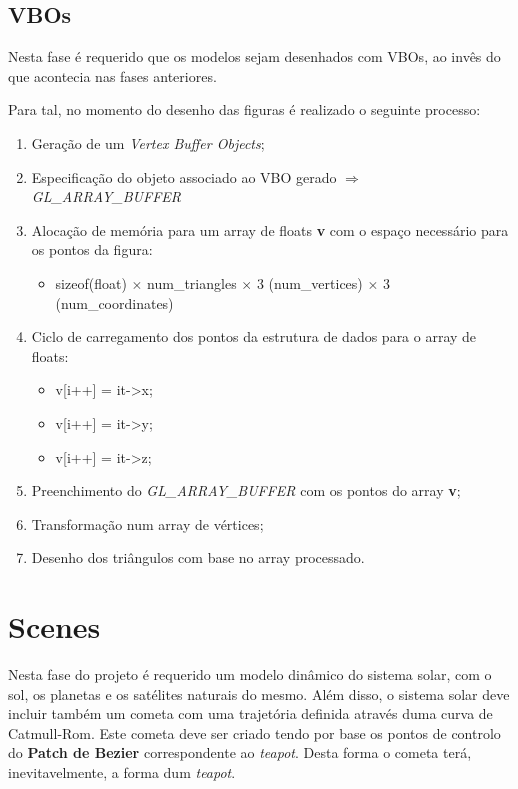 \documentclass[a4paper]{article}
\begin{document}
\subsection{VBOs}
\label{sec:vbos}

Nesta fase é requerido que os modelos sejam desenhados com VBOs, ao invês do que acontecia nas fases anteriores.

Para tal, no momento do desenho das figuras é realizado o seguinte processo:

\ttfamily
\begin{enumerate}
  \item Geração de um \textit{Vertex Buffer Objects};
  \item Especificação do objeto associado ao VBO gerado $\Rightarrow$ \textit{GL\_ARRAY\_BUFFER}
  \item Alocação de memória para um array de floats \textbf{v} com o espaço necessário para os pontos da figura:
    \begin{itemize}
      \item sizeof(float) $\times$ num\_triangles $\times$ 3 (num\_vertices) $\times$ 3 (num\_coordinates)
    \end{itemize}
  \item Ciclo de carregamento dos pontos da estrutura de dados para o array de floats:
    \begin{itemize}
      \item v[i++] = it->x;
      \item v[i++] = it->y;
      \item v[i++] = it->z;
    \end{itemize}
  \item Preenchimento do \textit{GL\_ARRAY\_BUFFER} com os pontos do array \textbf{v};
  \item Transformação num array de vértices;
  \item Desenho dos triângulos com base no array processado.
\end{enumerate}
\rmfamily


\newpage

\section{Scenes}
\label{sec:scenes}

Nesta fase do projeto é requerido um modelo dinâmico do sistema solar, com o sol, os planetas e os satélites naturais do mesmo. Além disso, o sistema solar deve incluir também um cometa com uma trajetória definida através duma curva de Catmull-Rom. Este cometa deve ser criado tendo por base os pontos de controlo do \textbf{Patch de Bezier} correspondente ao \textit{teapot}. Desta forma o cometa terá, inevitavelmente, a forma dum \textit{teapot}.
\end{document}
